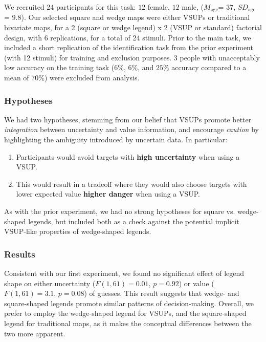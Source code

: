  We recruited 24 participants for this task: $12$ female, $12$ male, ($M_{\text{age}}$= $37$, $SD_{\text{age}}$ = $9.8$). Our selected square and wedge maps were either VSUPs or traditional bivariate maps, for a 2 (square or wedge legend) x 2 (VSUP or standard) factorial design, with 6 replications, for a total of 24 stimuli. Prior to the main task, we included a short replication of the identification task from the prior experiment (with 12 stimuli) for training and exclusion purposes. 3 people with unacceptably low accuracy on the training task ($6\%$, $6\%$, and $25\%$ accuracy compared to a mean of $70\%$) were excluded from analysis. 

\subsubsection{Hypotheses}

We had two hypotheses, stemming from our belief that VSUPs promote better \emph{integration} between uncertainty and value information, and encourage \emph{caution} by highlighting the ambiguity introduced by uncertain data. In particular:
\begin{enumerate}
	\item Participants would avoid targets with \textbf{high uncertainty} when using a VSUP.
	\item This would result in a tradeoff where they would also choose targets with lower expected value \textbf{higher danger} when using a VSUP.
\end{enumerate}

As with the prior experiment, we had no strong hypotheses for square vs. wedge-shaped legends, but included both as a check against the potential implicit VSUP-like properties of wedge-shaped legends.

\subsubsection{Results} 
\taskTwoHeatmap

Consistent with our first experiment, we found no significant effect of legend shape on either uncertainty ($F(1,61) = 0.01$, $p=0.92$) or value ($F(1,61)=3.1$, $p=0.08$) of guesses. This result suggests that wedge- and square-shaped legends promote similar patterns of decision-making. Overall, we prefer to employ the wedge-shaped legend for VSUPs, and the square-shaped legend for traditional maps, as it makes the conceptual differences between the two more apparent.

